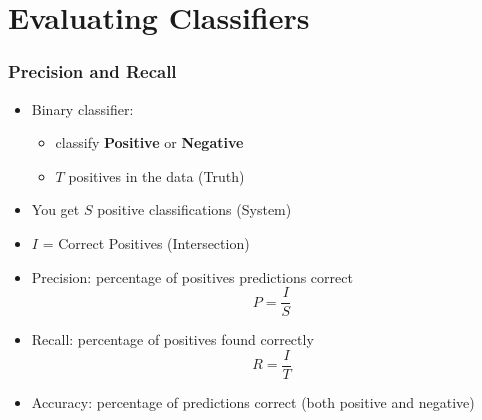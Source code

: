 \documentclass[mathserif, xcolor=table, svgnames]{beamer}
\begin{document}
{

}

{

}

{

}

\section{Evaluating Classifiers}
\frame{\tableofcontents[currentsection]}

\begin{frame}
  \frametitle{Precision and Recall}
  \begin{itemize}
  \item Binary classifier:
    \begin{itemize}
    \item classify \textbf{Positive} or \textbf{Negative}
    \item $T$ positives in the data (Truth)
    \end{itemize}
  \item You get $S$ positive classifications (System)
  \item $I$ = Correct Positives (Intersection)
  \item Precision: percentage of positives predictions correct
    \begin{equation*}
      P = \frac{I}{S}
    \end{equation*}
  \item Recall: percentage of positives found correctly
    \begin{equation*}
      R = \frac{I}{T}
    \end{equation*}
  \item Accuracy: percentage of predictions correct (both positive and negative)
  \end{itemize}
\end{frame}
\end{document}
